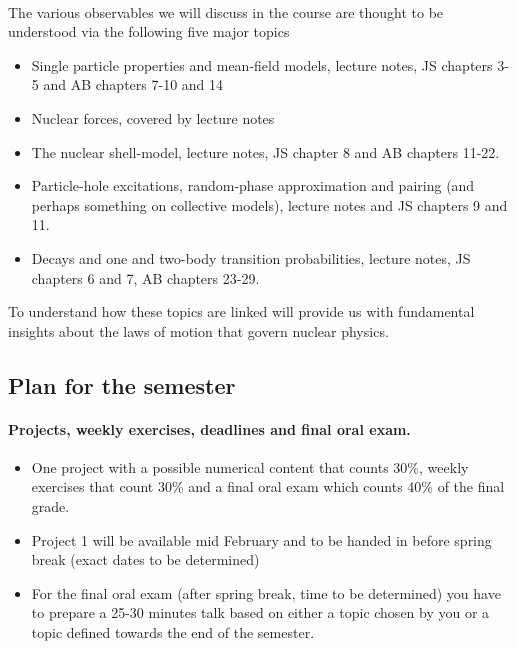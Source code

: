 \documentclass[%
twoside,                 %
final,                   %
10pt]{article}
\begin{document}
\paragraph{}
The various observables we will discuss in the course are thought to be understood via the following five 
major topics
\begin{itemize}
\item Single  particle properties and mean-field models, lecture notes, JS chapters 3-5 and AB chapters 7-10 and 14

\item Nuclear forces, covered by lecture notes

\item The nuclear shell-model, lecture notes, JS chapter 8 and AB chapters 11-22.

\item Particle-hole excitations, random-phase approximation and pairing (and perhaps something on collective models), lecture notes and JS chapters 9 and 11.

\item Decays and one and two-body transition probabilities, lecture notes, JS chapters 6 and 7, AB chapters 23-29.
\end{itemize}

\noindent
To understand how these topics are linked will provide us with fundamental insights about the laws of motion that govern nuclear physics.




\subsection{Plan for the semester}

\paragraph{Projects, weekly exercises, deadlines and final oral exam.}
\begin{itemize}
\item One  project with a possible numerical content that counts 30\%, weekly exercises  that count 30\% and a final oral exam which counts 40\% of the final grade. 

\item Project 1 will be available mid February and to be handed in before spring break (exact dates to be determined)

\item For the final oral exam (after spring break, time to be determined) you have to prepare a 25-30 minutes talk based on either a topic chosen by you or a topic defined towards the end of the semester.
\end{itemize}
\end{document}
